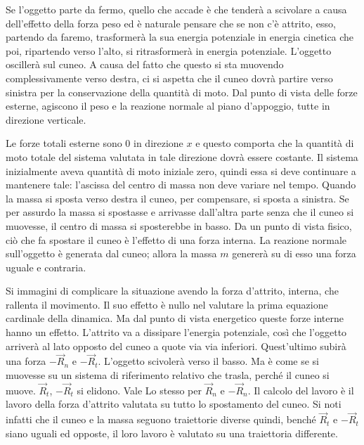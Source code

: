 \begin{figure}[htpb]
\end{figure}
\FloatBarrier
Se l'oggetto parte da fermo, quello che accade è che tenderà a scivolare a causa dell'effetto della forza peso ed è naturale pensare che se non c'è attrito, esso, partendo da faremo, trasformerà la sua energia potenziale in energia cinetica che poi, ripartendo verso l'alto, si ritrasformerà in energia potenziale. L'oggetto oscillerà sul cuneo. A causa del fatto che questo si sta muovendo complessivamente verso destra, ci si aspetta che il cuneo dovrà partire verso sinistra per la conservazione della quantità di moto. Dal punto di vista delle forze esterne, agiscono il peso e la reazione normale al piano d'appoggio, tutte in direzione verticale.

Le forze totali esterne sono $0$ in direzione $x$ e questo comporta che la quantità di moto totale del sistema valutata in tale direzione dovrà essere costante. Il sistema inizialmente aveva quantità di moto iniziale zero, quindi essa si deve continuare a mantenere tale: l'ascissa del centro di massa non deve variare nel tempo. Quando la massa si sposta verso destra il cuneo, per compensare, si sposta a sinistra. Se per assurdo la massa si spostasse e arrivasse dall'altra parte senza che il cuneo si muovesse, il centro di massa si sposterebbe in basso. Da un punto di vista fisico, ciò che fa spostare il cuneo è l'effetto di una forza interna. La reazione normale sull'oggetto è generata dal cuneo; allora la massa $m$ genererà su di esso una forza uguale e contraria.

Si immagini di complicare la situazione avendo la forza d'attrito, interna, che rallenta il movimento. Il suo effetto è nullo nel valutare la prima equazione cardinale della dinamica. Ma dal punto di vista energetico queste forze interne hanno un effetto. L'attrito va a dissipare l'energia potenziale, così che l'oggetto arriverà al lato opposto del cuneo a quote via via inferiori. Quest'ultimo subirà una forza $-\vec{R}_n$ e $-\vec{R}_t$. L'oggetto scivolerà verso il basso. Ma è come se si muovesse su un sistema di riferimento relativo che trasla, perché il cuneo si muove. $\vec{R}_t$, $-\vec{R}_t$ si elidono. Vale Lo stesso per $\vec{R}_n$ e $-\vec{R}_n$. Il calcolo del lavoro è il lavoro della forza d'attrito valutata su tutto lo spostamento del cuneo. Si noti infatti che il cuneo e la massa seguono traiettorie diverse quindi, benché $\vec{R}_t$ e $-\vec{R}_t$ siano uguali ed opposte, il loro lavoro è valutato su una traiettoria differente.

